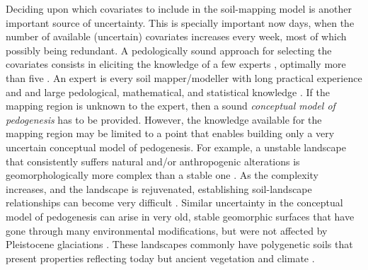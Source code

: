 Deciding upon which covariates to include in the soil-mapping model is another important source of 
uncertainty. This is specially important now days, when the number of available (uncertain) 
covariates increases every week, most of which possibly being redundant. A pedologically sound 
approach for selecting the covariates consists in eliciting the knowledge of a few experts 
\citep{LarkEtAl2007b}, optimally more than five \citep{MeyerEtAl2001}. An expert is every soil 
mapper/modeller with long practical experience and and large pedological, mathematical, and 
statistical knowledge \citep{MeyerEtAl2001}. If the mapping region is unknown to the expert, then
a sound \textit{conceptual model of pedogenesis} has to be provided. However, the knowledge 
available for the mapping region may be limited to a point that enables building only a very 
uncertain conceptual model of pedogenesis. For example, a unstable landscape that consistently 
suffers natural and/or anthropogenic alterations is geomorphologically more complex than a stable
one \citep{Schumm1979}. As the complexity increases, and the landscape is rejuvenated, establishing 
soil-landscape relationships can become very difficult \citep{StreckEtAl2008}. Similar uncertainty 
in the conceptual model of pedogenesis can arise in very old, stable geomorphic surfaces that have 
gone through many environmental modifications, but were not affected by Pleistocene glaciations 
\citep{McKenzieEtAl2000a}. These landscapes commonly have polygenetic soils that present properties
reflecting today but ancient vegetation and climate \citep{PainEtAl1995, Ker1998a}.

